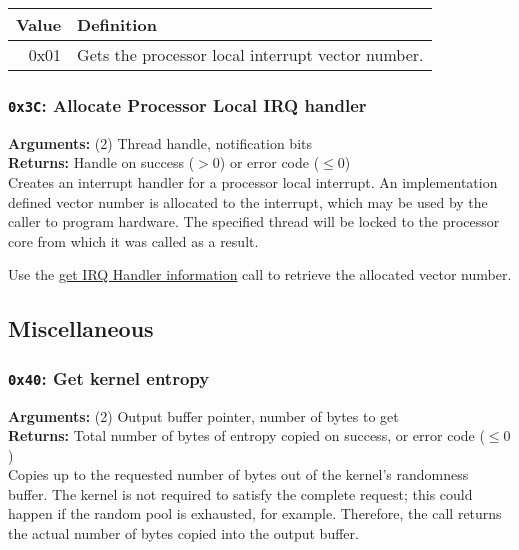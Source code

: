 \documentclass[11pt]{article}
\begin{document}
\begin{table}[h]
\begin{tabular}{|r|l|}
\hline
\rowcolor[HTML]{EFEFEF} 
\cellcolor[HTML]{EFEFEF}\textbf{Value} & \textbf{Definition} \\ \hline
0x01 & Gets the processor local interrupt vector number. \\ \hline
\end{tabular}
\end{table}

\subsubsection{{\tt 0x3C}: Allocate Processor Local IRQ handler}
\textbf{Arguments:} (2) Thread handle, notification bits \\
\textbf{Returns:} Handle on success ($> 0$) or error code ($\leq0$) \\

Creates an interrupt handler for a processor local interrupt. An implementation defined vector number is allocated to the interrupt, which may be used by the caller to program hardware. The specified thread will be locked to the processor core from which it was called as a result.

Use the \hyperlink{section.3.6.4}{get IRQ Handler information} call to retrieve the allocated vector number.



\newpage
\subsection{Miscellaneous}

\subsubsection{{\tt 0x40}: Get kernel entropy}
\textbf{Arguments:} (2) Output buffer pointer, number of bytes to get \\
\textbf{Returns:} Total number of bytes of entropy copied on success, or error code ($\leq0$) \\

Copies up to the requested number of bytes out of the kernel's randomness buffer. The kernel is not required to satisfy the complete request; this could happen if the random pool is exhausted, for example. Therefore, the call returns the actual number of bytes copied into the output buffer.
\end{document}
